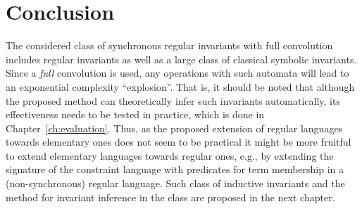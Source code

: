 \section{Conclusion}
The considered class of synchronous regular invariants with full convolution includes regular invariants as well as a large class of classical symbolic invariants. Since a \emph{full} convolution is used, any operations with such automata will lead to an exponential complexity ``explosion''. That is, it should be noted that although the proposed method can theoretically infer such invariants automatically, its effectiveness needs to be tested in practice, which is done in Chapter~\cref{ch:evaluation}.
Thus, as the proposed extension of regular languages towards elementary ones does not seem to be practical it might be more fruitful to extend elementary languages towards regular ones, e.\:g., by extending the signature of the constraint language with predicates for term membership in a (non-synchronous) regular language.
Such class of inductive invariants and the method for invariant inference in the class are proposed in the next chapter.
